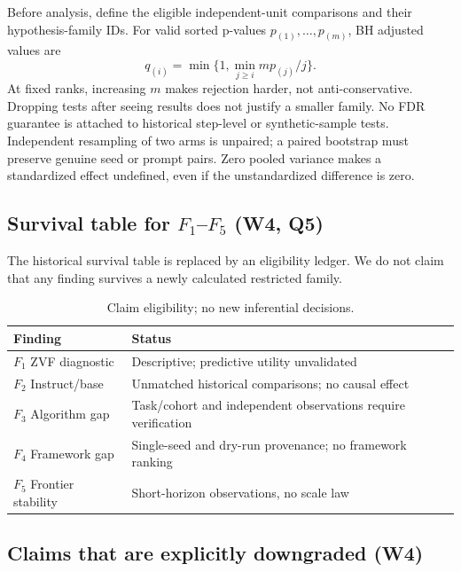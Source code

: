 Before analysis, define the eligible independent-unit comparisons and their
hypothesis-family IDs. For valid sorted p-values $p_{(1)},\ldots,p_{(m)}$,
BH adjusted values are
\begin{equation}\label{eq:bh-restricted}
q_{(i)}=\min\{1,\min_{j\ge i}m p_{(j)}/j\}.
\end{equation}
At fixed ranks, increasing $m$ makes rejection harder, not anti-conservative.
Dropping tests after seeing results does not justify a smaller family. No FDR
guarantee is attached to historical step-level or synthetic-sample tests.
Independent resampling of two arms is unpaired; a paired bootstrap must
preserve genuine seed or prompt pairs. Zero pooled variance makes a standardized
effect undefined, even if the unstandardized difference is zero.

\subsection{Survival table for $F_1$--$F_5$ (W4, Q5)}
\label{sec:stat-rigor-addendum:survival}

The historical survival table is replaced by an eligibility ledger. We do not
claim that any finding survives a newly calculated restricted family.
\begin{table}[ht]
\centering\small
\caption{Claim eligibility; no new inferential decisions.}
\label{tab:survival-f1-f5}
\begin{tabular}{lp{.70\linewidth}}
\toprule
Finding & Status \\
\midrule
$F_1$ ZVF diagnostic & Descriptive; predictive utility unvalidated \\
$F_2$ Instruct/base & Unmatched historical comparisons; no causal effect \\
$F_3$ Algorithm gap & Task/cohort and independent observations require verification \\
$F_4$ Framework gap & Single-seed and dry-run provenance; no framework ranking \\
$F_5$ Frontier stability & Short-horizon observations, no scale law \\
\bottomrule
\end{tabular}
\end{table}

\subsection{Claims that are explicitly downgraded (W4)}
\label{sec:stat-rigor-addendum:downgrades}

